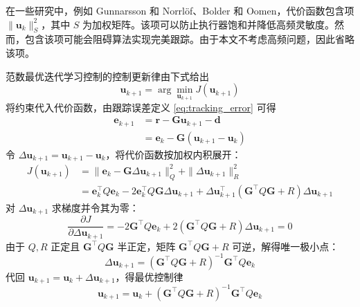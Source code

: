 \begin{remark}
	在一些研究中，例如 Gunnarsson 和 Norrlöf、Bolder 和 Oomen，代价函数包含项 \(\|\mathbf{u}_{k}\|_S^2\)，其中 \(S\) 为加权矩阵。该项可以防止执行器饱和并降低高频灵敏度。然而，包含该项可能会阻碍算法实现完美跟踪。由于本文不考虑高频问题，因此省略该项。
\end{remark}

范数最优迭代学习控制的控制更新律由下式给出
\begin{equation}
	\mathbf{u}_{k+1} = \arg \min_{\mathbf{u}_{k+1}} J(\mathbf{u}_{k+1})
	\label{eq:update_law_NOILC}
\end{equation}
将约束代入代价函数，由跟踪误差定义 \eqref{eq:tracking_error} 可得
\begin{equation}
	\begin{aligned}
		\mathbf{e}_{k+1} &= \mathbf{r} - \mathbf{G} \mathbf{u}_{k+1} - \mathbf{d} \\
		&= \mathbf{e}_k - \mathbf{G}(\mathbf{u}_{k+1} - \mathbf{u}_k)
	\end{aligned}
	\label{eq:ekp1_decompose}
\end{equation}
令 \(\Delta\mathbf{u}_{k+1} = \mathbf{u}_{k+1} - \mathbf{u}_k\)，将代价函数按加权内积展开：
\begin{align}
	J(\mathbf{u}_{k+1}) &= \|\mathbf{e}_k - \mathbf{G}\Delta\mathbf{u}_{k+1}\|_Q^2 + \|\Delta\mathbf{u}_{k+1}\|_R^2 \nonumber\\
	&= \mathbf{e}_k^\top Q \mathbf{e}_k - 2\mathbf{e}_k^\top Q \mathbf{G} \Delta\mathbf{u}_{k+1} + \Delta\mathbf{u}_{k+1}^\top (\mathbf{G}^\top Q \mathbf{G} + R) \Delta\mathbf{u}_{k+1}
	\label{eq:cost_quadratic}
\end{align}
对 \(\Delta\mathbf{u}_{k+1}\) 求梯度并令其为零：
\begin{equation}
	\frac{\partial J}{\partial \Delta\mathbf{u}_{k+1}} = -2\mathbf{G}^\top Q \mathbf{e}_k + 2(\mathbf{G}^\top Q \mathbf{G} + R) \Delta\mathbf{u}_{k+1} = 0
	\label{eq:first_order}
\end{equation}
由于 \(Q, R\) 正定且 \(\mathbf{G}^\top Q \mathbf{G}\) 半正定，矩阵 \(\mathbf{G}^\top Q \mathbf{G} + R\) 可逆，解得唯一极小点：
\begin{equation}
	\Delta\mathbf{u}_{k+1} = (\mathbf{G}^\top Q \mathbf{G} + R)^{-1} \mathbf{G}^\top Q \mathbf{e}_k
\end{equation}
代回 \(\mathbf{u}_{k+1} = \mathbf{u}_k + \Delta\mathbf{u}_{k+1}\)，得最优控制律
\begin{equation}
	\mathbf{u}_{k+1} = \mathbf{u}_{k} + (\mathbf{G}^\top Q \mathbf{G} + R)^{-1} \mathbf{G}^\top Q \mathbf{e}_{k}
	\label{eq:optimal_control}
\end{equation}
